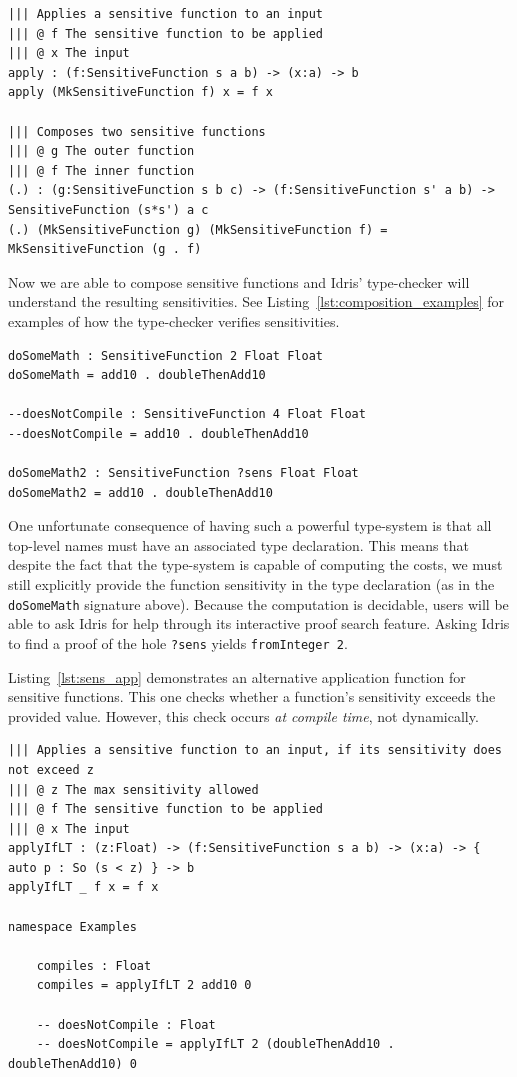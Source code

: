 \documentclass[12pt]{article}
\begin{document}
\begin{lstlisting}[caption={Sensitive function operations},label={lst:sens_fns_ops}]
||| Applies a sensitive function to an input
||| @ f The sensitive function to be applied
||| @ x The input
apply : (f:SensitiveFunction s a b) -> (x:a) -> b
apply (MkSensitiveFunction f) x = f x

||| Composes two sensitive functions
||| @ g The outer function
||| @ f The inner function
(.) : (g:SensitiveFunction s b c) -> (f:SensitiveFunction s' a b) -> SensitiveFunction (s*s') a c
(.) (MkSensitiveFunction g) (MkSensitiveFunction f) = MkSensitiveFunction (g . f)
\end{lstlisting}

Now we are able to compose sensitive functions and Idris' type-checker will understand the resulting sensitivities.
See Listing~\ref{lst:composition_examples} for examples of how the type-checker verifies sensitivities.

\begin{lstlisting}[caption={Examples of Sensitive Function Composition},label={lst:composition_examples}]
doSomeMath : SensitiveFunction 2 Float Float
doSomeMath = add10 . doubleThenAdd10

--doesNotCompile : SensitiveFunction 4 Float Float
--doesNotCompile = add10 . doubleThenAdd10

doSomeMath2 : SensitiveFunction ?sens Float Float
doSomeMath2 = add10 . doubleThenAdd10
\end{lstlisting}

One unfortunate consequence of having such a powerful type-system is that all top-level names must have an associated type declaration.
This means that despite the fact that the type-system is capable of computing the costs, we must still explicitly provide the function sensitivity in the type declaration (as in the \texttt{doSomeMath} signature above).
Because the computation is decidable, users will be able to ask Idris for help through its interactive proof search feature.
Asking Idris to find a proof of the hole \texttt{?sens} yields \texttt{fromInteger 2}.

Listing~\ref{lst:sens_app} demonstrates an alternative application function for sensitive functions.
This one checks whether a function's sensitivity exceeds the provided value.
However, this check occurs \textit{at compile time}, not dynamically.

\begin{lstlisting}[caption={Sensitivity-aware function application},label={lst:sens_app}]
||| Applies a sensitive function to an input, if its sensitivity does not exceed z
||| @ z The max sensitivity allowed
||| @ f The sensitive function to be applied
||| @ x The input
applyIfLT : (z:Float) -> (f:SensitiveFunction s a b) -> (x:a) -> { auto p : So (s < z) } -> b
applyIfLT _ f x = f x

namespace Examples

    compiles : Float
    compiles = applyIfLT 2 add10 0

    -- doesNotCompile : Float
    -- doesNotCompile = applyIfLT 2 (doubleThenAdd10 . doubleThenAdd10) 0
\end{lstlisting}
\end{document}
